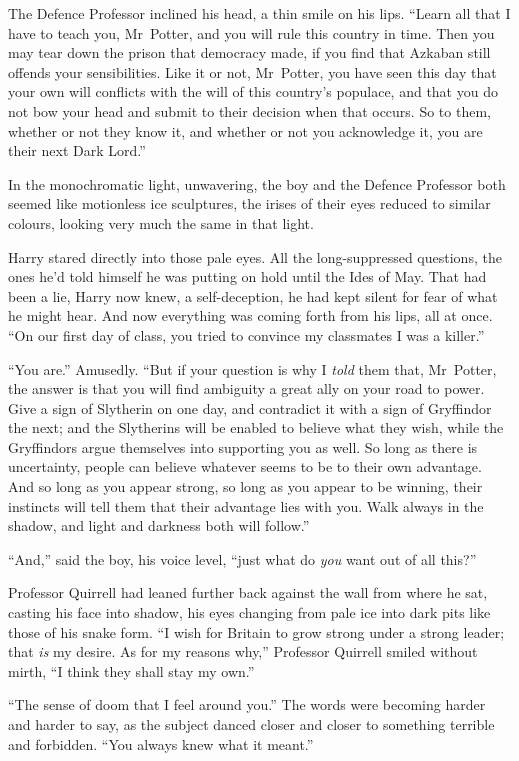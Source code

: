 The Defence Professor inclined his head, a thin smile on his lips.
“Learn all that I have to teach you, Mr~Potter, and you will rule this country in time. Then you may tear down the prison that democracy made, if you find that Azkaban still offends your sensibilities. Like it or not, Mr~Potter, you have seen this day that your own will conflicts with the will of this country’s populace, and that you do not bow your head and submit to their decision when that occurs. So to them, whether or not they know it, and whether or not you acknowledge it, you are their next Dark Lord.”

In the monochromatic light, unwavering, the boy and the Defence Professor both seemed like motionless ice sculptures, the irises of their eyes reduced to similar colours, looking very much the same in that light.

Harry stared directly into those pale eyes. All the long-suppressed questions, the ones he’d told himself he was putting on hold until the Ides of May. That had been a lie, Harry now knew, a self-deception, he had kept silent for fear of what he might hear. And now everything was coming forth from his lips, all at once.
“On our first day of class, you tried to convince my classmates I was a killer.”

“You are.” Amusedly.
“But if your question is why I \emph{told} them that, Mr~Potter, the answer is that you will find ambiguity a great ally on your road to power. Give a sign of Slytherin on one day, and contradict it with a sign of Gryffindor the next; and the Slytherins will be enabled to believe what they wish, while the Gryffindors argue themselves into supporting you as well. So long as there is uncertainty, people can believe whatever seems to be to their own advantage. And so long as you appear strong, so long as you appear to be winning, their instincts will tell them that their advantage lies with you. Walk always in the shadow, and light and darkness both will follow.”

“And,” said the boy, his voice level, “just what do \emph{you} want out of all this?”

Professor Quirrell had leaned further back against the wall from where he sat, casting his face into shadow, his eyes changing from pale ice into dark pits like those of his snake form.
“I wish for Britain to grow strong under a strong leader; that \emph{is} my desire. As for my reasons why,” Professor Quirrell smiled without mirth,
“I think they shall stay my own.”

“The sense of doom that I feel around you.” The words were becoming harder and harder to say, as the subject danced closer and closer to something terrible and forbidden.
“You always knew what it meant.”

